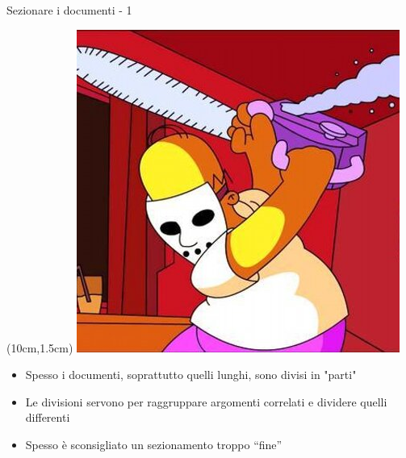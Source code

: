 \begin{frame}{Sezionare i documenti - 1}

\begin{textblock*}{2cm}(10cm,1.5cm)
	\includegraphics[scale=0.15]{res/images/sezionamento}
\end{textblock*}

\vspace*{20pt}

\begin{itemize}

	\item Spesso i documenti, soprattutto quelli lunghi, sono divisi in "parti"
	\item Le divisioni servono per raggruppare argomenti correlati e dividere
	quelli differenti
	\item Spesso è sconsigliato un sezionamento troppo ``fine''

\end{itemize}

\end{frame}